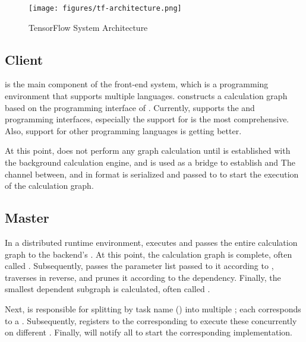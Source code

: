 \begin{content}
\begin{figure}[H]
  \centering
  \texttt{[image: figures/tf-architecture.png]}
  \caption{TensorFlow System Architecture}
  \label{fig:tf-architecture}
\end{figure}


\subsection{Client}
 is the main component of the front-end system, which is a programming environment that supports multiple languages.  constructs a calculation graph based on the programming interface of . Currently,  supports the  and  programming interfaces, especially the  support for  is the most comprehensive. Also,  support for other programming languages ​​is getting better.

At this point,  does not perform any graph calculation until  is established with the background calculation engine, and  is used as a bridge to establish  and  The channel between, and  in  format is serialized and passed to  to start the execution of the calculation graph.


\subsection{Master}
In a distributed runtime environment,  executes  and passes the entire calculation graph to the backend's . At this point, the calculation graph is complete, often called \emph{}. Subsequently,  passes the  parameter list passed to it according to , traverses  in reverse, and prunes it according to the dependency. Finally, the smallest dependent subgraph is calculated, often called .

Next,  is responsible for splitting  by task name () into multiple ; each  corresponds to a . Subsequently,  registers  to the corresponding  to execute these  concurrently on different . Finally,  will notify all  to start the corresponding  implementation.


\end{content}
